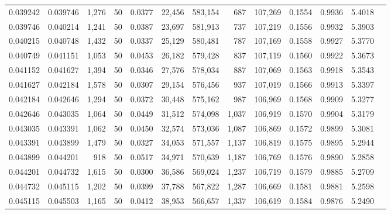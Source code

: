 \begin{tabular}{rrrrrrrrrrrrr}
0.039242 & 0.039746 & 1,276 &  50 &                                     0.0377 &  22,456 & 583,154 &     687 & 107,269 & 0.1554 & 0.9936 & 5.4018 \\
0.039746 & 0.040214 & 1,241 &  50 &                                     0.0387 &  23,697 & 581,913 &     737 & 107,219 & 0.1556 & 0.9932 & 5.3903 \\
0.040215 & 0.040748 & 1,432 &  50 &                                     0.0337 &  25,129 & 580,481 &     787 & 107,169 & 0.1558 & 0.9927 & 5.3770 \\
0.040749 & 0.041151 & 1,053 &  50 &                                     0.0453 &  26,182 & 579,428 &     837 & 107,119 & 0.1560 & 0.9922 & 5.3673 \\
0.041152 & 0.041627 & 1,394 &  50 &                                     0.0346 &  27,576 & 578,034 &     887 & 107,069 & 0.1563 & 0.9918 & 5.3543 \\
0.041627 & 0.042184 & 1,578 &  50 &                                     0.0307 &  29,154 & 576,456 &     937 & 107,019 & 0.1566 & 0.9913 & 5.3397 \\
0.042184 & 0.042646 & 1,294 &  50 &                                     0.0372 &  30,448 & 575,162 &     987 & 106,969 & 0.1568 & 0.9909 & 5.3277 \\
0.042646 & 0.043035 & 1,064 &  50 &                                     0.0449 &  31,512 & 574,098 &   1,037 & 106,919 & 0.1570 & 0.9904 & 5.3179 \\
0.043035 & 0.043391 & 1,062 &  50 &                                     0.0450 &  32,574 & 573,036 &   1,087 & 106,869 & 0.1572 & 0.9899 & 5.3081 \\
0.043391 & 0.043899 & 1,479 &  50 &                                     0.0327 &  34,053 & 571,557 &   1,137 & 106,819 & 0.1575 & 0.9895 & 5.2944 \\
0.043899 & 0.044201 &   918 &  50 &                                     0.0517 &  34,971 & 570,639 &   1,187 & 106,769 & 0.1576 & 0.9890 & 5.2858 \\
0.044201 & 0.044732 & 1,615 &  50 &                                     0.0300 &  36,586 & 569,024 &   1,237 & 106,719 & 0.1579 & 0.9885 & 5.2709 \\
0.044732 & 0.045115 & 1,202 &  50 &                                     0.0399 &  37,788 & 567,822 &   1,287 & 106,669 & 0.1581 & 0.9881 & 5.2598 \\
0.045115 & 0.045503 & 1,165 &  50 &                                     0.0412 &  38,953 & 566,657 &   1,337 & 106,619 & 0.1584 & 0.9876 & 5.2490 \\

\end{tabular}

